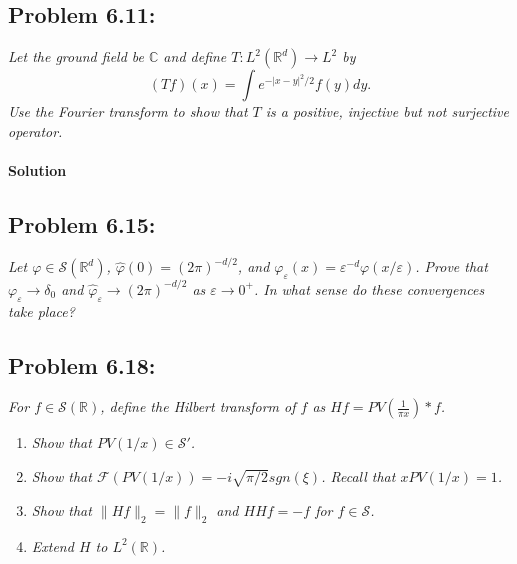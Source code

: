 \documentclass[letterpaper,twoside,11pt]{article}
\theoremstyle{mystyle}
\newcommand{\R}{{\mathbb R}}
\begin{document}
\newpage
\subsection*{Problem 6.11:}
\textit{Let the ground field be $\mathbb C$ and define $T: L^2\left( \R^d  \right) \to L^2$ by }
\[\left( Tf \right)(x) = \int e^{-|x-y|^2/2} f(y) dy.\]
\textit{Use the Fourier transform to show that $T$ is a positive, injective but not surjective operator. }
\paragraph*{Solution}

















\newpage 
\subsection*{Problem 6.15:}
\textit{Let $\varphi \in \mathcal S \left( \R^d \right)$, $\hat \varphi \left( 0 \right) = \left( 2\pi \right)^{-d/2}$, and $\varphi_\varepsilon \left( x \right) = \varepsilon^{-d} \varphi\left( x/\varepsilon \right)$. Prove that $\varphi_\varepsilon \to \delta_0$ and $\hat \varphi_\varepsilon \to \left( 2\pi  \right)^{-d/2}$ as $\varepsilon \to 0^+$. In what sense do these convergences take place? }









\newpage
\subsection*{Problem 6.18:}
\textit{For $f\in \mathcal S\left( \R \right)$, define the Hilbert transform of $f$ as $Hf = PV\left( \frac{1}{\pi x} \right)\ast f$. }
\begin{enumerate}
  \item \textit{Show that $PV\left( 1/x \right)\in \mathcal S'$. }
  \item \textit{Show that $\mathcal F\left( PV\left( 1/x \right) \right) = -i\sqrt{\pi /2 }sgn(\xi)$. Recall that $x PV\left( 1/x \right) = 1$. }
  \item \textit{Show that $\|Hf\|_2 = \|f\|_2$ and $HHf = -f$ for $f \in \mathcal S$. }
  \item \textit{Extend $H$ to $L^2\left( \R \right)$.} 
\end{enumerate}
\end{document}
